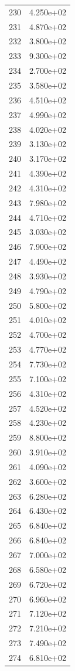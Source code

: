 \documentclass[12pt]{article}
\begin{document}
\begin{longtable}{@{}cc@{}}
230 & 4.250e+02 \\
231 & 4.870e+02 \\
232 & 3.800e+02 \\
233 & 9.300e+02 \\
234 & 2.700e+02 \\
235 & 3.580e+02 \\
236 & 4.510e+02 \\
237 & 4.990e+02 \\
238 & 4.020e+02 \\
239 & 3.130e+02 \\
240 & 3.170e+02 \\
241 & 4.390e+02 \\
242 & 4.310e+02 \\
243 & 7.980e+02 \\
244 & 4.710e+02 \\
245 & 3.030e+02 \\
246 & 7.900e+02 \\
247 & 4.490e+02 \\
248 & 3.930e+02 \\
249 & 4.790e+02 \\
250 & 5.800e+02 \\
251 & 4.010e+02 \\
252 & 4.700e+02 \\
253 & 4.770e+02 \\
254 & 7.730e+02 \\
255 & 7.100e+02 \\
256 & 4.310e+02 \\
257 & 4.520e+02 \\
258 & 4.230e+02 \\
259 & 8.800e+02 \\
260 & 3.910e+02 \\
261 & 4.090e+02 \\
262 & 3.600e+02 \\
263 & 6.280e+02 \\
264 & 6.430e+02 \\
265 & 6.840e+02 \\
266 & 6.840e+02 \\
267 & 7.000e+02 \\
268 & 6.580e+02 \\
269 & 6.720e+02 \\
270 & 6.960e+02 \\
271 & 7.120e+02 \\
272 & 7.210e+02 \\
273 & 7.490e+02 \\
274 & 6.810e+02 \\

\end{longtable}
\end{document}
